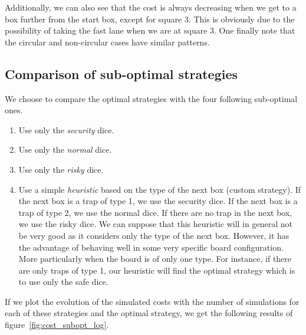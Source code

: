 Additionally, we can also see that the cost is always decreasing when we get to a box further from the start box, except for square 3. 
This is obviously due to the possibility of taking the fast lane when we are at square 3.
One finally note that the circular and non-circular cases have similar patterns. 

\subsection{Comparison of sub-optimal strategies}
We choose to compare the optimal strategies with the four following sub-optimal ones.
\begin{enumerate}
	\item Use only the \emph{security} dice.
	\item Use only the \emph{normal} dice.
	\item Use only the \emph{risky} dice.
	\item Use a simple \emph{heuristic} based on the type of the next box (custom strategy).
	If the next box is a trap of type 1, we use the security dice. 
	If the next box is a trap of type 2, we use the normal dice.
	If there are no trap in the next box, we use the risky dice. 
	We can suppose that this heuristic will in general not be very good 
  as it considers only the type of the next box. 
	However, it has the advantage of behaving well in some very specific board configuration. 
	More particularly when the board is of only one type.
	For instance, if there are only traps of type 1,
  our heuristic will find the optimal strategy which is to use only the safe dice. 
\end{enumerate}

If we plot the evolution of the simulated costs with the number of simulations for each of these strategies and the optimal strategy, we get the following 
results of figure~\ref{fig:cost_subopt_log}. 

